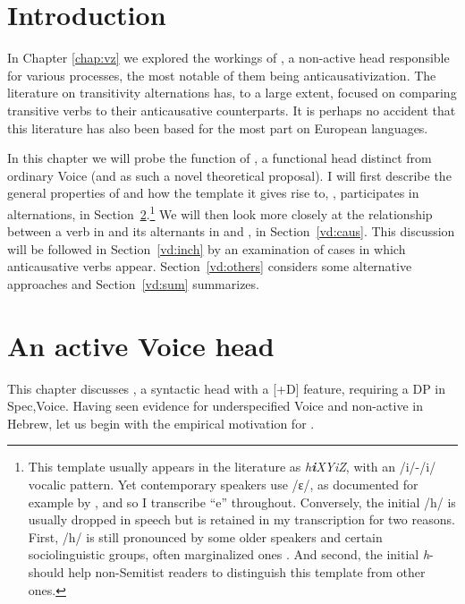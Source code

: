 \label{chap:vd}

\section{Introduction}
In Chapter \ref{chap:vz} we explored the workings of {\vz}, a non-active head responsible for various processes, the most notable of them being anticausativization. The literature on transitivity alternations has, to a large extent, focused on comparing transitive verbs to their anticausative counterparts. It is perhaps no accident that this literature has also been based for the most part on European languages.

In this chapter we will probe the function of {\vd}, a functional head distinct from ordinary Voice (and as such a novel theoretical proposal). I will first describe the general properties of {\vd} and how the template it gives rise to, {\thif}, participates in alternations, in Section~\ref{vd:vd}.\footnote{This template usually appears in the literature as \emph{h\textbf{i}XYiZ}, with an /i/-/i/ vocalic pattern. Yet contemporary speakers use /ɛ/, as documented for example by \cite{trachtman16}, and so I transcribe ``e'' throughout. Conversely, the initial /h/ is usually dropped in speech but is retained in my transcription for two reasons. First, /h/ is still pronounced by some older speakers and certain sociolinguistic groups, often marginalized ones \citep[cf.~][]{schwarzwald81biu,gafter14phd}. And second, the initial \emph{h}- should help non-Semitist readers to distinguish this template from other ones.} We will then look more closely at the relationship between a verb in {\tkal} and its alternants in {\tnif} and {\thif}, in Section~\ref{vd:caus}. This discussion will be followed in Section~\ref{vd:inch} by an examination of cases in which anticausative verbs appear. Section~\ref{vd:others} considers some alternative approaches and Section~\ref{vd:sum} summarizes.

\section{An active Voice head} \label{vd:vd}
This chapter discusses {\vd}, a syntactic head with a [+D] feature, requiring a DP in Spec,Voice. Having seen evidence for underspecified Voice and non-active {\vz} in Hebrew, let us begin with the empirical motivation for {\vd}.

